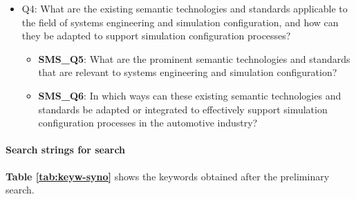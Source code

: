 \begin{itemize}
                \item Q4: What are the existing semantic technologies and standards applicable to the field of systems engineering and simulation configuration, and how can they be adapted to support simulation configuration processes?
                    \begin{itemize}
                        \item \textbf{SMS\_Q5}: What are the prominent semantic technologies and standards that are relevant to systems engineering and simulation configuration?

                        \item \textbf{SMS\_Q6}: In which ways can these existing semantic technologies and standards be adapted or integrated to effectively support simulation configuration processes in the automotive industry?
                    \end{itemize}

            \end{itemize}

            
            \paragraph{Search strings for search}
            \textbf{Table \ref{tab:keyw-syno}} shows the keywords obtained after the preliminary search.\\

